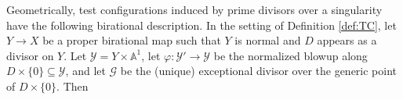 \documentclass[12pt]{amsart}
\theoremstyle{definition}
\newtheorem{defn}[prop]{Definition}
\newcommand{\bA}{\mathbb{A}}
\newcommand{\bQ}{\mathbb{Q}}
\newcommand{\bZ}{\mathbb{Z}}
\newcommand{\bG}{\mathbb{G}}
\newcommand{\cO}{\mathcal{O}}
\newcommand{\cR}{\mathcal{R}}
\newcommand{\scX}{\mathscr{X}}
\newcommand{\scY}{\mathscr{Y}}
\newcommand{\scD}{\mathscr{D}}
\newcommand{\fa}{\mathfrak{a}}
\newcommand{\Spec}{\mathrm{Spec}}
\newcommand{\ord}{\mathrm{ord}}
\newcommand{\gr}{\mathrm{gr}}
\numberwithin{equation}{section}
\begin{document}



Geometrically, test configurations induced by prime divisors over a singularity have the following birational description. In the setting of Definition \ref{def:TC}, let $Y\to X$ be a proper birational map such that $Y$ is normal and $D$ appears as a divisor on $Y$. Let $\scY=Y\times \bA^1$, let $\varphi\colon \scY'\to \scY$ be the normalized blowup along $D\times \{0\}\subseteq \scY$, and let $\mathscr{G}$ be the (unique) exceptional divisor over the generic point of $D\times \{0\}$. Then

\end{document}
